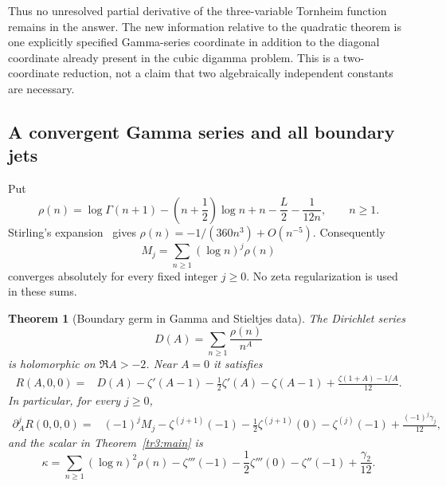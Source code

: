 \documentclass[11pt]{article}
\numberwithin{equation}{section}
\theoremstyle{plain}
\newtheorem{theorem}{Theorem}[section]
\theoremstyle{definition}
\theoremstyle{remark}
\begin{document}
Thus no unresolved partial derivative of the three-variable Tornheim
function remains in the answer.  The new information relative to the
quadratic theorem is one explicitly specified Gamma-series coordinate
in addition to the diagonal coordinate already present in the cubic
digamma problem.  This is a two-coordinate reduction, not a claim that
two algebraically independent constants are necessary.

\subsection{A convergent Gamma series and all boundary jets}

Put
\begin{equation}\label{tr3:rho}
 \rho(n)=\log\Gamma(n+1)-\left(n+\frac12\right)\log n
            +n-\frac L2-\frac{1}{12n},\qquad n\geq1.
\end{equation}
Stirling's expansion~\cite[\S5.11]{tr3:DLMF} gives $\rho(n)=-1/(360n^3)+O(n^{-5})$.
Consequently
\[
 M_j=\sum_{n\geq1}(\log n)^j\rho(n)
\]
converges absolutely for every fixed integer $j\geq0$.  No zeta
regularization is used in these sums.

\begin{theorem}[Boundary germ in Gamma and Stieltjes data]
\label{tr3:boundary}
The Dirichlet series
\[
 D(A)=\sum_{n\geq1}\frac{\rho(n)}{n^A}
\]
is holomorphic on $\Re A>-2$.  Near $A=0$ it satisfies
\begin{align}\label{tr3:boundarygerm}
 R(A,0,0)={}&D(A)-\zeta'(A-1)-\frac12\zeta'(A)
            -\zeta(A-1)
            +\frac{\zeta(1+A)-1/A}{12}.
\end{align}
In particular, for every $j\geq0$,
\begin{align}\label{tr3:boundaryjets}
 \partial_A^jR(0,0,0)
 ={}&(-1)^j M_j-\zeta^{(j+1)}(-1)
 -\frac12\zeta^{(j+1)}(0)-\zeta^{(j)}(-1)
 +\frac{(-1)^j\gamma_j}{12},
\end{align}
and the scalar in Theorem~\ref{tr3:main} is
\begin{equation}\label{tr3:kappa}
 \boxed{\displaystyle
 \kappa=\sum_{n\geq1}(\log n)^2\rho(n)
       -\zeta'''(-1)-\frac12\zeta'''(0)-\zeta''(-1)
       +\frac{\gamma_2}{12}.}
\end{equation}
\end{theorem}
\end{document}
